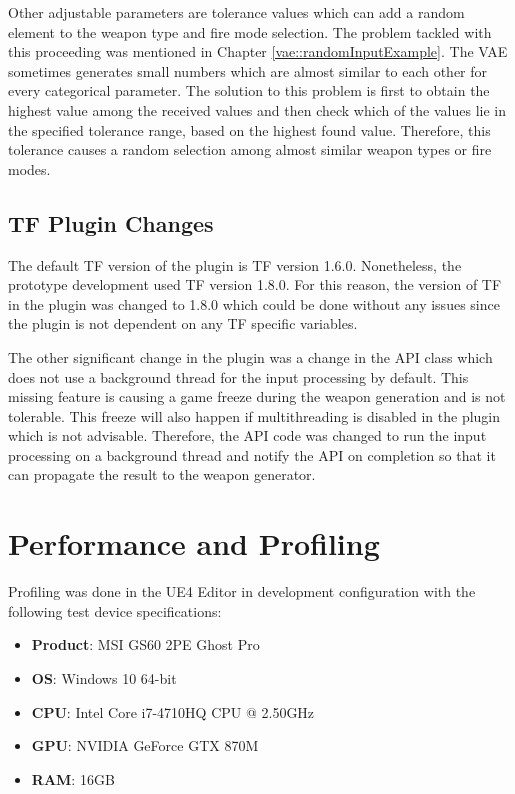 \documentclass[MGS,Master,english]{twbook}%
\begin{document}
Other adjustable parameters are tolerance values which can add a random element to the weapon type and fire mode selection. The problem tackled with this proceeding was mentioned in Chapter \ref{vae::randomInputExample}. The VAE sometimes generates small numbers which are almost similar to each other for every categorical parameter. The solution to this problem is first to obtain the highest value among the received values and then check which of the values lie in the specified tolerance range, based on the highest found value. Therefore, this tolerance causes a random selection among almost similar weapon types or fire modes.

\subsection{\acl{TF} Plugin Changes}
The default TF version of the plugin is TF version 1.6.0. Nonetheless, the prototype development used TF version 1.8.0. For this reason, the version of TF in the plugin was changed to 1.8.0 which could be done without any issues since the plugin is not dependent on any TF specific variables.

The other significant change in the plugin was a change in the API class which does not use a background thread for the input processing by default. This missing feature is causing a game freeze during the weapon generation and is not tolerable. This freeze will also happen if multithreading is disabled in the plugin which is not advisable. Therefore, the API code was changed to run the input processing on a background thread and notify the API on completion so that it can propagate the result to the weapon generator.

\section{Performance and Profiling}
Profiling was done in the UE4 Editor in development configuration with the following test device specifications:
\begin{itemize}
	\item \textbf{Product}: MSI GS60 2PE Ghost Pro
	\item \textbf{OS}: Windows 10 64-bit
	\item \textbf{CPU}: Intel Core i7-4710HQ CPU @ 2.50GHz
	\item \textbf{GPU}: NVIDIA GeForce GTX 870M
	\item \textbf{\ac{RAM}}: 16GB
\end{itemize}
\end{document}
